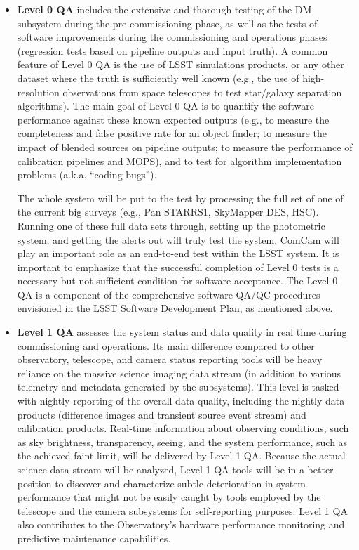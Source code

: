 \documentclass[SE,toc,lsstdraft]{lsstdoc}
\newcommand{\oldtext}[1]{{\color{red} #1}}
\newcommand{\newtext}[1]{{\color{blue} #1}}
\begin{document}
\begin{itemize}
\item {\bf Level 0 QA} includes the extensive and thorough testing of the DM subsystem
during the pre-commissioning phase, as well as the tests of software improvements
during the commissioning and operations phases (regression tests based on pipeline
outputs and input truth). A common feature of Level 0 QA is
the use of LSST simulations products, or any other dataset where the truth is sufficiently
well known (e.g., the use of high-resolution observations from space telescopes to test
star/galaxy separation algorithms). The main goal of Level 0 QA is to quantify the
software performance against these known expected outputs (e.g., to measure the
completeness and false positive rate for an object finder; to measure the impact of
blended sources on pipeline outputs; to measure the performance of calibration pipelines
and MOPS), and to test for algorithm implementation problems (a.k.a. ``coding bugs'').

The whole system will be put to the test by processing the full set of one of the current big surveys (e.g., \oldtext{Pan STARRS1, SkyMapper} \newtext{DES, HSC}). Running one of these full data sets through, setting up the photometric system, and getting the alerts out will truly test the system.
\newtext{ComCam will play an important role as an end-to-end test within the LSST system.}
It is important to emphasize that the successful completion of Level 0 tests is a necessary
but not sufficient condition for software acceptance. The Level 0 QA is a component of the comprehensive software QA/QC procedures envisioned in the LSST Software Development Plan, as mentioned above.

\item {\bf Level 1 QA} assesses the system status and data quality in real time during
commissioning and operations. Its
main difference compared to other observatory, telescope, and camera status reporting
tools will be heavy reliance on the massive science imaging data stream (in addition to various
telemetry and metadata generated by the subsystems). This level is tasked
with nightly reporting of the overall data quality, including the nightly data products
(difference images and transient source event stream) and calibration products.
Real-time information about observing conditions, such as sky brightness,
transparency, seeing, and the system performance, such as the achieved faint limit, will be delivered
by Level 1 QA. Because the actual science data stream will be analyzed, Level 1 QA tools will be
in a better position to discover and characterize subtle deterioration in system performance
that might not be easily caught by tools employed by the telescope
and the camera subsystems for self-reporting purposes. Level 1 QA also contributes to the Observatory's hardware performance monitoring and predictive maintenance capabilities.


\end{itemize}
\end{document}
